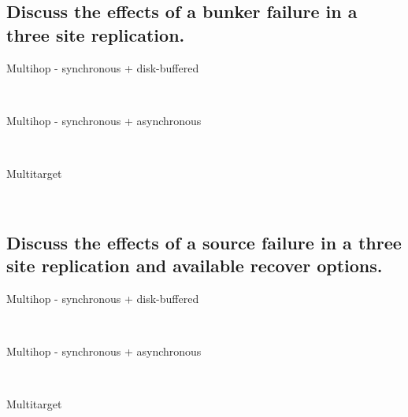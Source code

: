 
\subsection{Discuss the effects of a bunker failure in a three site replication.} %
\label{sub:discuss_the_effects_of_a_bunker_failure}

	\begin{description}
		\item[Multihop - synchronous + disk-buffered] \hfill \\
		\item[Multihop - synchronous + asynchronous] \hfill \\
		\item[Multitarget] \hfill \\
	\end{description}


\subsection{Discuss the effects of a source failure in a three site replication and available recover options.} %
\label{sub:discuss_the_effects_of_a_source_failure_in_a_three_site_replication_and_available_recover_options}

	\begin{description}
		\item[Multihop - synchronous + disk-buffered] \hfill \\
		\item[Multihop - synchronous + asynchronous] \hfill \\
		\item[Multitarget] \hfill \\
	\end{description}


